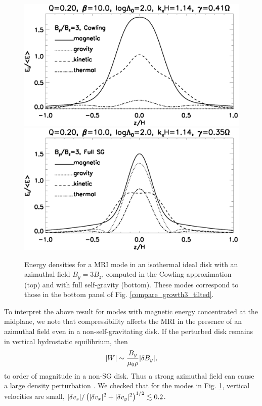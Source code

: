 \begin{figure}
  \includegraphics[width=\linewidth,clip=true,trim=0cm 1.5cm 0cm
    0cm]{figures/result_tilted_cowling.ps}  
  \includegraphics[width=\linewidth,clip=true,trim=0cm 0cm 0cm
    0.cm]{figures/result_tilted_fullsg.ps} 
  \caption{Energy densities for a MRI mode in an isothermal ideal disk
    with an azimuthal field $B_y = 3B_z$, computed in the Cowling
    approximation (top) and with full self-gravity (bottom). These
    modes correspond to those in the bottom panel of
    Fig. \ref{compare_growth3_tilted}.    
    \label{result_tilted}}
\end{figure}

To interpret the above result for modes with magnetic energy
concentrated at the midplane, we note that compressibility affects the
MRI in the presence of an azimuthal field even in a
non-self-gravitating disk. If the perturbed disk remains in vertical
hydrostatic equilibrium, then  
\begin{align} 
  |W|\sim \frac{B_y}{\mu_0\rho}|\delta B_y|,
\end{align}
to order of magnitude in a non-SG disk. Thus a strong azimuthal field can 
cause a large density perturbation \citep{pessah05}. We checked that
for the modes in Fig. \ref{result_tilted}, vertical velocities are 
small, $|\delta v_z|/\left(|\delta v_x|^2+|\delta v_y|^2\right)^{1/2} \lesssim 0.2$. 

